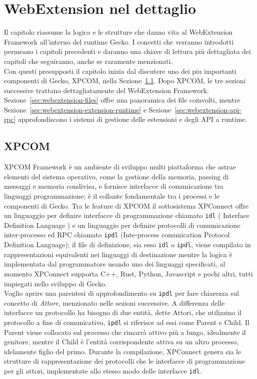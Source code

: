 \documentclass{sapthesis}
\newcommand{\code}[1]{\texttt{#1}}
\newcommand{\refSection}[1]{Sezione~\ref{#1}}
\newcommand{\idl}{\code{idl}}
\newcommand{\ipdl}{\code{ipdl}}
\begin{document}
\chapter{WebExtension nel dettaglio}
\label{cap:webextension-dettaglio}

    Il capitolo riassume la logica e le strutture che danno vita al WebExtension Framework all'interno
    del runtime Gecko. I concetti che verranno introdotti permeano i capitoli precedenti e daranno
    una chiave di lettura più dettagliata dei capitoli che seguiranno, anche se raramente menzionati.\\
    Con questi presupposti il capitolo inizia dal discutere uno dei piu importanti componenti di Gecko,
    XPCOM, nella \refSection{sec:xpcom}.
    Dopo XPCOM, le tre sezioni successive trattano dettagliatamente del WebExtension Framework.
    \refSection{sec:webextension-files} offre una panoramica dei file coinvolti, mentre \refSection{sec:webextension-extension-runtime}
    e \refSection{sec:webextension-api-rpc} approfondiscono i sistemi di gestione delle estensioni e
    degli API a runtime.

    \section{XPCOM}
    \label{sec:xpcom}
        XPCOM Framework è un ambiente di sviluppo multi piattaforma che astrae elementi del sistema operativo,
        come la gestione della memoria, passing di messaggi e memoria condivisa, e fornisce interfacce di 
        comunicazione tra linguaggi programmazione; è il collante fondamentale tra i processi e le componenti di
        Gecko. Tra le feature di XPCOM il sottosistema XPConnect offre un linguaggio per definire
        interfacce di programmazione chiamato \idl{} ( Interface Definition Language ) e un linguaggio per definire protocolli
        di comunicazione inter-processo ed RPC chiamato \ipdl{} (Inte-process comunication Protocol Definition Language);
        il file di definizione, sia esso \idl{} o \ipdl{}, viene compilato in rappresentazioni equivalenti nei linguaggi
        di destinazione mentre la logica è implementata dal programmatore usando uno dei linguaggi specificati,
        al momento XPConnect supporta C++, Rust, Python, Javascript e pochi altri, tutti impiegati nello sviluppo
        di Gecko.\\
        Voglio aprire una parentesi di approfondimento su \ipdl{} per fare chiarezza sul concetto di \textit{Attore}, 
        menzionato nelle sezioni successive. A differenza delle interfacce un protocollo ha bisogno di due entità,
        dette Attori, che utilizzino il protocollo a fine di comunicativo, \ipdl{} si riferisce ad essi come 
        Parent e Child. Il Parent viene collocato sul processo che rimarrà attivo più a lungo, idealmente il genitore, 
        mentre il Child è l'entità corrispondente attiva su un altro processo, idelamente figlio del primo.
        Durante la compilazione, XPConnect genera sia le strutture di rappresentazione dei protocolli che le
        interfacce di programmazione per gli attori, implementate allo stesso modo delle interfacce \idl{}.
\end{document}
